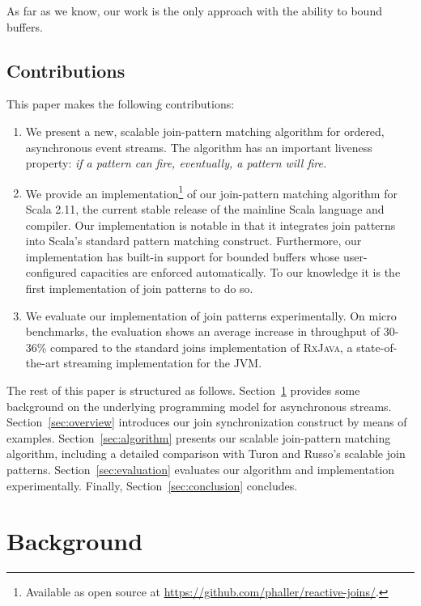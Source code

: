 \documentclass[runningheads]{llncs}
\begin{document}
\begin{sloppypar}
As far as we know, our work is the only approach with the ability to bound buffers.

\subsection{Contributions}\label{sec:contribs}

This paper makes the following contributions:

\begin{enumerate}

\item We present a new, scalable join-pattern matching algorithm for ordered,
asynchronous event streams. The algorithm has an important liveness property:
{\em if a pattern can fire, eventually, a pattern will fire.}

\item We provide an implementation\footnote{Available as open source at
\url{https://github.com/phaller/reactive-joins/}.} of our join-pattern matching
algorithm for Scala 2.11, the current stable release of the mainline Scala
language and compiler. Our implementation is notable in that it integrates
join patterns into Scala's standard pattern matching construct. Furthermore,
our implementation has built-in support for bounded buffers whose
user-configured capacities are enforced automatically. To our knowledge it is the
first implementation of join patterns to do so.

\item We evaluate our implementation of join patterns experimentally. On micro
benchmarks, the evaluation shows an average increase in throughput of 30-36\%
compared to the standard joins implementation of \textsc{RxJava}, a
state-of-the-art streaming implementation for the JVM.

\end{enumerate}

The rest of this paper is structured as follows. Section~\ref{sec:background}
provides some background on the underlying programming model for asynchronous
streams. Section~\ref{sec:overview} introduces our join synchronization
construct by means of examples. Section~\ref{sec:algorithm} presents our
scalable join-pattern matching algorithm, including a detailed comparison with
Turon and Russo's scalable join patterns.
Section~\ref{sec:evaluation} evaluates our algorithm and implementation
experimentally. Finally, Section~\ref{sec:conclusion} concludes.


\section{Background}\label{sec:background}


\end{sloppypar}
\end{document}
